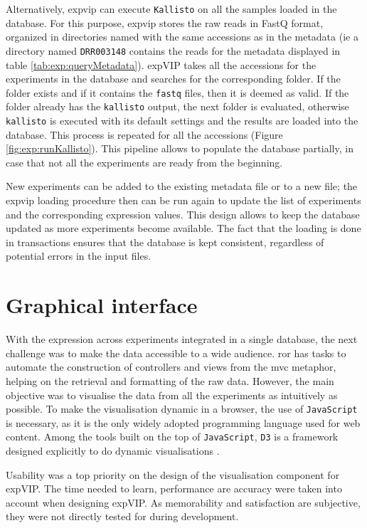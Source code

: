 Alternatively, \gls{expvip} can execute \verb|Kallisto| on all the samples loaded in the database. 
For this purpose, \gls{expvip} stores the raw reads in FastQ format, organized in directories named with the same accessions as in the metadata (ie a directory named \verb|DRR003148| contains the reads for the metadata displayed in table \ref{tab:exp:queryMetadata}). 
expVIP takes all the accessions for the experiments in the database and searches for the corresponding folder. 
If the folder exists and if it contains the \verb|fastq| files, then it is deemed as valid. 
If the folder already has the \verb|kallisto| output, the next folder is evaluated, otherwise \verb|kallisto| is executed with its default settings and the results are loaded into the database. 
This process is repeated for all the accessions (Figure \ref{fig:exp:runKallisto}).  
This pipeline allows to populate the database partially, in case that not all the experiments are ready from the beginning. 

New experiments can be added to the existing metadata file  or to a new file; the \gls{expvip} loading procedure then can be run again to update the list of experiments and the corresponding expression values. 
This design allows to keep the database updated as more experiments become available. 
The fact that the loading is done in transactions ensures that the database is kept consistent, regardless of potential errors in the input files. 

\section{Graphical interface}
\label{exp:gui}  
With the expression across experiments integrated in a single database, the next challenge was to make the data accessible to a wide audience. 
\acrshort{ror} has tasks to automate the construction of controllers and views from the \acrshort{mvc} metaphor, helping on the retrieval and formatting of the raw data. 
However, the main objective was to visualise the data from all the experiments as intuitively as possible. 
To make the visualisation dynamic in a browser, the use of \verb|JavaScript| is necessary, as it is the only widely adopted programming language used for web content. 
Among the tools built on the top of \verb|JavaScript|, \verb|D3| is a framework designed explicitly to do dynamic visualisations \citep{Bostock2011}. 

Usability was a top priority on the design of the visualisation component for expVIP. 
The time needed to learn, performance are accuracy were taken into account when designing expVIP. 
As memorability and satisfaction are subjective, they were not directly tested for during development.  


